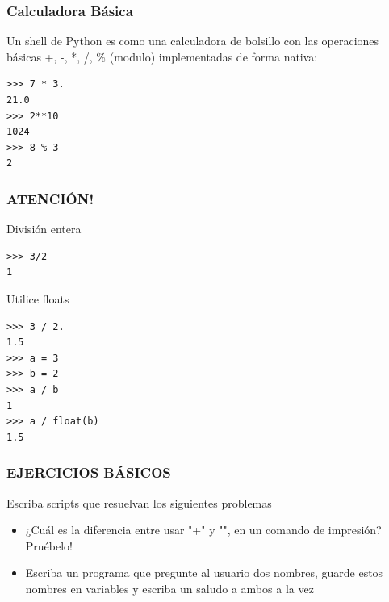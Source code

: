 \documentclass[10pt,colorlinks]{beamer}
\begin{document}
\begin{frame}[fragile]\frametitle{Calculadora Básica}
\begin{block}{Un shell de Python es como una calculadora de bolsillo con las operaciones básicas +, -, *, /, \% (modulo) implementadas de forma nativa:}
\begin{verbatim}
>>> 7 * 3.
21.0
>>> 2**10
1024
>>> 8 % 3
2
\end{verbatim}

\end{block}

\end{frame}
\begin{frame}[fragile]\frametitle{ATENCIÓN!}
\begin{block}{División entera}
\small
\begin{verbatim}
>>> 3/2
1
\end{verbatim}

\end{block}
\begin{block}{Utilice floats}
\tiny
\begin{verbatim}
>>> 3 / 2.
1.5
>>> a = 3
>>> b = 2
>>> a / b
1
>>> a / float(b)
1.5
\end{verbatim}

\end{block}
\end{frame}








\begin{frame}[fragile]\frametitle{EJERCICIOS BÁSICOS}
\begin{block}{Escriba scripts que resuelvan los siguientes problemas}
\begin{itemize}
    \item ¿Cuál es la diferencia entre usar "+" y "", en un comando de impresión? Pruébelo!
    \item Escriba un programa que pregunte al usuario dos nombres, guarde estos nombres en variables y escriba un saludo a ambos a la vez
\end{itemize}

\end{block}


\end{frame}
\end{document}
